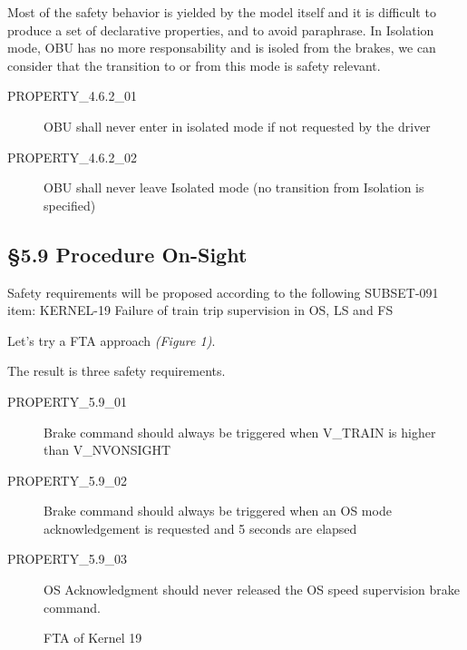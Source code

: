 \documentclass{template/openetcs_report}
\begin{document}
Most of the safety behavior is yielded by the model itself and it is difficult to produce a set of declarative properties, and to avoid paraphrase. In Isolation mode, OBU has no more responsability and is isoled from the brakes, we can consider that the transition to or from this mode is safety relevant. 
\begin{description}
\item [PROPERTY\_4.6.2\_01] OBU shall never enter in isolated mode if not requested by the driver
\item [PROPERTY\_4.6.2\_02] OBU shall never leave Isolated mode (no transition from Isolation is specified)
\end{description}

\subsection{\S5.9 Procedure On-Sight}
Safety requirements will be proposed according to the following SUBSET-091 item:
\newline KERNEL-19 Failure of train trip supervision in OS, LS and FS

Let's try a FTA approach \emph{(Figure 1)}.

The result is three safety requirements.
\begin{description}
\item [PROPERTY\_5.9\_01] Brake command should always be triggered when V\_TRAIN is higher than V\_NVONSIGHT
\item [PROPERTY\_5.9\_02] Brake command should always be triggered when an OS mode acknowledgement is requested and 5 seconds are elapsed
\item [PROPERTY\_5.9\_03] OS Acknowledgment should never released the OS speed supervision brake command.
\end{description}

\begin{figure}  
\centering  
{}  
\caption{FTA of Kernel 19}  
\label{fig:FTA_of_kernel_19}
\end{figure}
\end{document}
